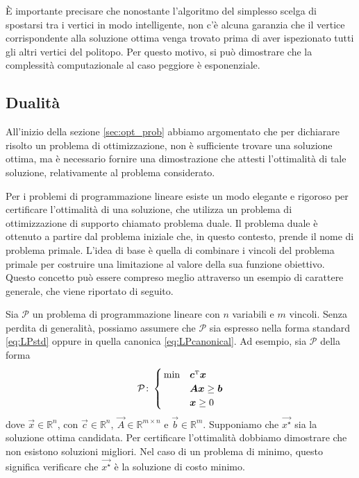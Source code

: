 \`E importante precisare che nonostante l'algoritmo del simplesso scelga di spostarsi tra i vertici in modo
intelligente, non c'è alcuna garanzia che il vertice corrispondente alla soluzione ottima venga trovato prima di aver
ispezionato tutti gli altri vertici del politopo. Per questo motivo, si può dimostrare che la complessità computazionale
al caso peggiore è esponenziale.

\subsection{Dualità}\label{sec:lpduality}
All'inizio della sezione \ref{sec:opt_prob} abbiamo argomentato che per dichiarare risolto un problema di
ottimizzazione, non è sufficiente trovare una soluzione ottima, ma è necessario fornire una dimostrazione
che attesti l'ottimalità di tale soluzione, relativamente al problema considerato.

Per i problemi di programmazione lineare esiste un modo elegante e rigoroso per certificare l'ottimalità di una
soluzione, che utilizza un problema di ottimizzazione di supporto chiamato problema duale. Il problema duale è ottenuto
a partire dal problema iniziale che, in questo contesto, prende il nome di problema primale. L'idea di base è quella di
combinare i vincoli del problema primale per costruire una limitazione al valore della sua funzione obiettivo. Questo
concetto può essere compreso meglio attraverso un esempio di carattere generale, che viene riportato di seguito.

Sia $\mathcal{P}$ un problema di programmazione lineare con $n$ variabili e
$m$ vincoli. Senza perdita di generalità, possiamo assumere che
$\mathcal{P}$ sia espresso nella forma standard \eqref{eq:LPstd} oppure in
quella canonica \eqref{eq:LPcanonical}. Ad esempio, sia $\mathcal{P}$ della
forma
\begin{equation}\label{eq:canonicalduality}
    \mathcal{P}\colon
    \begin{cases}
        \,\min & \bm{c}^{\scriptscriptstyle\mathrm{T}} \bm{x} \\
               & \bm{A} \bm{x} \ge \bm{b} \\
             & \bm{x} \ge 0
    \end{cases}\\[5pt]
\end{equation}
dove $\vec{x} \in \mathbb{R}^n$, con $\vec{c} \in \mathbb{R}^n,\ \vec{A} \in \mathbb{R}^{m \times n}$ e $\vec{b} \in
\mathbb{R}^m$. Supponiamo che \( \vec{x^{\star}} \) sia la soluzione ottima candidata. Per certificare l'ottimalità
dobbiamo dimostrare che non esistono soluzioni migliori. Nel caso di un problema di minimo, questo significa verificare
che \( \vec{x^{\star}} \) è la soluzione di costo minimo.

